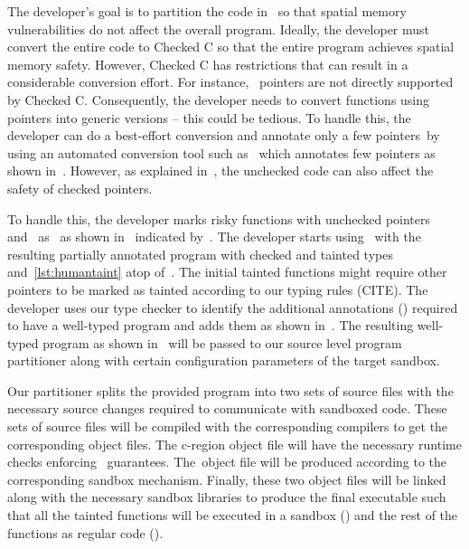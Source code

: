 
The developer's goal is to partition the code in~ so that spatial memory vulnerabilities do not affect the overall program.
Ideally, the developer must convert the entire code to Checked C so that the entire program achieves spatial memory safety.
However, Checked C has restrictions that can result in a considerable conversion effort.
For instance,~ pointers are not directly supported by Checked C.
Consequently, the developer needs to convert functions using~ pointers into generic versions -- this could be tedious.
To handle this, the developer can do a best-effort conversion and annotate only a few pointers~\eg by using an automated conversion tool such as~\threec{} which annotates few pointers as shown in~.
However, as explained in~, the unchecked code can also affect the safety of checked pointers.


To handle this, the developer marks risky functions with unchecked pointers~\ie~ and~ as~ as shown in~ indicated by~\useradded.
The developer starts using~\systemname{} with the resulting partially annotated program with checked and tainted types~\ie~ and~\ref{lst:humantaint} atop of~.
The initial tainted functions might require other pointers to be marked as tainted according to our typing rules (CITE).
The developer uses our type checker to identify the additional annotations (\usermods) required to have a well-typed program and adds them as shown in~.
The resulting well-typed program as shown in~ will be passed to our source level program partitioner along with certain configuration parameters of the target sandbox.

Our partitioner splits the provided program into two sets of source files with the necessary source changes required to communicate with sandboxed code.
These sets of source files will be compiled with the corresponding compilers to get the corresponding object files.
The c-region object file will have the necessary runtime checks enforcing~\systemname{} guarantees.
The~\ucregion object file will be produced according to the corresponding sandbox mechanism.
Finally, these two object files will be linked along with the necessary sandbox libraries to produce the final executable such that all the tainted functions will be executed in a sandbox (\ucregion) and the rest of the functions as regular code (\cregion).


